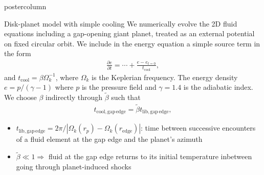 \documentclass[final,hyperref={pdfpagelabels=false}]{beamer}
\begin{document}
\begin{frame}
\begin{columns}
\begin{column}{.49\textwidth}
\begin{beamercolorbox}[center,wd=\textwidth]{postercolumn}
\begin{minipage}[T]{.95\textwidth}
{            \begin{block}{{\Large Disk-planet model with simple
                  cooling}}
              \justifying
             We numerically evolve the 2D fluid equations including a
             gap-opening giant planet, treated as an external
             potential on fixed circular orbit. We include in the
             energy equation  
        a simple source term in the form 
	\begin{align*}
	\frac{\partial e}{\partial t} = \cdots + \frac{e-e_{t=0}}{t_\mathrm{cool}},
	\end{align*}
        and $t_\mathrm{cool} = \beta \Omega_k^{-1}$, where $\Omega_k$
        is the Keplerian frequency. The energy density
        $e=p/(\gamma-1)$ where $p$ is the pressure field and
        $\gamma=1.4$ is the adiabatic index. We choose $\beta$ indirectly 
        through $\tilde{\beta}$ such that
        \begin{align*}
        t_\mathrm{cool, gap\,edge} = \tilde{\beta} t_\mathrm{lib, gap\,edge},
        \end{align*}
\vspace{-1.6cm}
        \begin{itemize}
        \item  $t_\mathrm{lib, gap\,edge}=2\pi/|\Omega_k(r_p)-\Omega_k(r_\mathrm{edge})|$: time between
          successive encounters of a fluid element at the gap
          edge and the planet's azimuth
        \item $\tilde{\beta}\ll 1 \Rightarrow$ fluid at the gap edge
          returns to its initial temperature inbetween going through planet-induced shocks 
        \end{itemize}
        \end{block}
        \vfill

}
\end{minipage}
\end{beamercolorbox}
\end{column}
\end{columns}
\end{frame}
\end{document}
